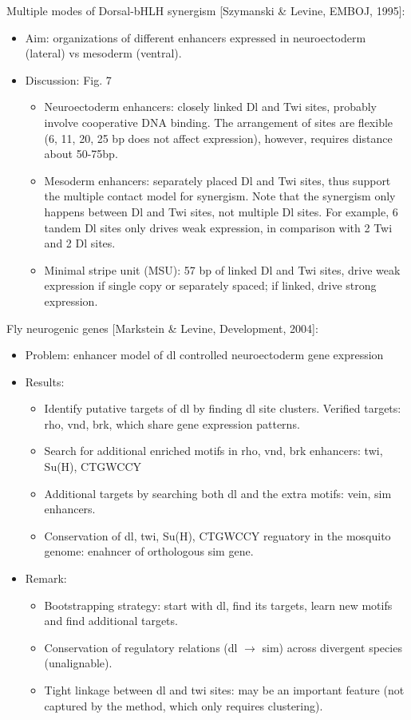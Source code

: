 \documentclass{report}
\begin{document}
\begin{enumerate}
	Multiple modes of Dorsal-bHLH synergism [Szymanski \& Levine, EMBOJ, 1995]:
	\begin{itemize}
		\item Aim: organizations of different enhancers expressed in neuroectoderm (lateral) vs mesoderm (ventral). 
		
		\item Discussion: Fig. 7
		\begin{itemize}
			\item Neuroectoderm enhancers: closely linked Dl and Twi sites, probably involve cooperative DNA binding. The arrangement of sites are flexible (6, 11, 20, 25 bp does not affect expression), however, requires distance about 50-75bp. 
			\item Mesoderm enhancers: separately placed Dl and Twi sites, thus support the multiple contact model for synergism. Note that the synergism only happens between Dl and Twi sites, not multiple Dl sites. For example, 6 tandem Dl sites only drives weak expression, in comparison with 2 Twi and 2 Dl sites. 
			\item Minimal stripe unit (MSU): 57 bp of linked Dl and Twi sites, drive weak expression if single copy or separately spaced; if linked, drive strong expression. 
		\end{itemize}
	\end{itemize}
	
	Fly neurogenic genes [Markstein \& Levine, Development, 2004]:
	\begin{itemize}
		\item Problem: enhancer model of dl controlled neuroectoderm gene expression
		
		\item Results:
		\begin{itemize}
			\item Identify putative targets of dl by finding dl site clusters. Verified targets: rho, vnd, brk, which share gene expression patterns. 
			\item Search for additional enriched motifs in rho, vnd, brk enhancers: twi, Su(H), CTGWCCY
			\item Additional targets by searching both dl and the extra motifs: vein, sim enhancers. 
			\item Conservation of dl, twi, Su(H), CTGWCCY reguatory in the mosquito genome: enahncer of orthologous sim gene. 
		\end{itemize}
		
		\item Remark:
		\begin{itemize}
			\item Bootstrapping strategy: start with dl, find its targets, learn new motifs and find additional targets. 
			\item Conservation of regulatory relations (dl $\rightarrow$ sim) across divergent species (unalignable). 
			\item Tight linkage between dl and twi sites: may be an important feature (not captured by the method, which only requires clustering). 
		\end{itemize}
	\end{itemize}
	

\end{enumerate}
\end{document}
